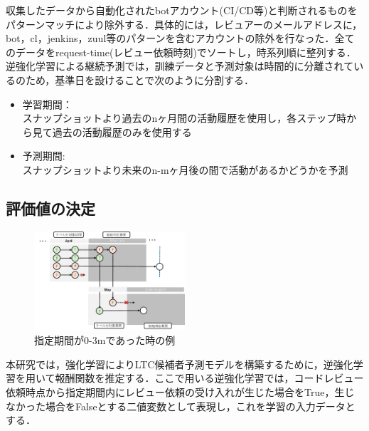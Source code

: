 \documentclass[submit,techrep,noauthor]{ipsj}
\begin{document}
収集したデータから自動化されたbotアカウント(CI/CD等)と判断されるものをパターンマッチにより除外する．具体的には，レビュアーのメールアドレスに，bot，cl，jenkins，zuul等のパターンを含むアカウントの除外を行なった．全てのデータをrequest-time(レビュー依頼時刻)でソートし，時系列順に整列する．逆強化学習による継続予測では，訓練データと予測対象は時間的に分離されているのため，基準日を設けることで次のように分割する．
\begin{itemize}
    \item 学習期間：\\ 
    スナップショットより過去のnヶ月間の活動履歴を使用し，各ステップ時から見て過去の活動履歴のみを使用する
    \item 予測期間:\\
    スナップショットより未来のn-mヶ月後の間で活動があるかどうかを予測
\end{itemize}



\subsection{評価値の決定}
\begin{figure}[h]
    \centering
    \includegraphics[width = 0.5\textwidth]{./Hashimoto_fig/label.pdf}
    \caption{指定期間が0-3mであった時の例}
    \label{fig:label}
\end{figure}


本研究では，強化学習によりLTC候補者予測モデルを構築するために，逆強化学習を用いて報酬関数を推定する．ここで用いる逆強化学習では，コードレビュー依頼時点から指定期間内にレビュー依頼の受け入れが生じた場合をTrue，生じなかった場合をFalseとする二値変数として表現し，これを学習の入力データとする．


\end{document}
